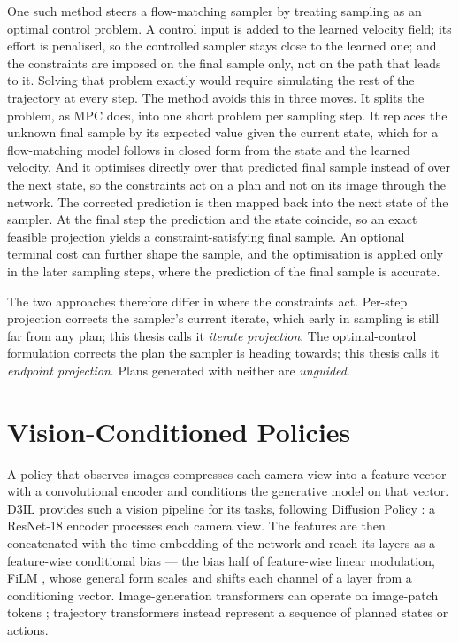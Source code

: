 \documentclass[headsepline,footsepline,footinclude=false,oneside,fontsize=11pt,paper=a4,listof=totoc,bibliography=totoc]{scrbook}
\theoremstyle{definition}
\theoremstyle{plain}
\theoremstyle{remark}
\begin{document}
One such method \parencite{li2025hardflow} steers a flow-matching sampler by treating sampling as an
optimal control problem. A control input is added to the learned velocity field; its effort is penalised, so
the controlled sampler stays close to the learned one; and the constraints are imposed on the final
sample only, not on the path that leads to it. Solving that problem exactly would require simulating
the rest of the trajectory at every step. The method avoids this in three moves. It splits the problem,
as \ac{MPC} does, into one short problem per sampling step. It replaces the unknown
final sample by its expected value given the current state, which for a flow-matching model follows in
closed form from the state and the learned velocity. And it optimises directly over that predicted
final sample instead of over the next state, so the constraints act on a plan and not on its image
through the network. The corrected prediction is then mapped back into the next state of the sampler.
At the final step the prediction and the state coincide, so an exact feasible projection yields a
constraint-satisfying final sample. An optional terminal cost can further shape the sample, and the optimisation is applied only
in the later sampling steps, where the prediction of the final sample is accurate.

The two approaches therefore differ in where the constraints act. Per-step projection corrects the
sampler's current iterate, which early in sampling is still far from any plan; this thesis calls it
\emph{iterate projection}. The optimal-control formulation corrects the plan the sampler is heading
towards; this thesis calls it \emph{endpoint projection}. Plans generated with neither are \emph{unguided}.

\section{Vision-Conditioned Policies}\label{sec:bg:visual}

A policy that observes images compresses each camera view into a feature vector with a convolutional
encoder and conditions the generative model on that vector. D3IL \parencite{jia2024towards} provides
such a vision pipeline for its tasks, following Diffusion Policy \parencite{chi2023diffusion}: a
ResNet-18 encoder \parencite{he2016deep} processes each camera view. The features are then
concatenated with the time embedding of the network and reach its layers as a feature-wise
conditional bias --- the bias half of feature-wise linear modulation, \ac{FiLM}
\parencite[Sec.~3]{perez2017film}, whose general form scales and shifts each channel of a layer from
a conditioning vector. Image-generation transformers can operate on image-patch tokens \parencite{peebles2022dit};
trajectory transformers instead represent a sequence of planned states or actions.
\end{document}
